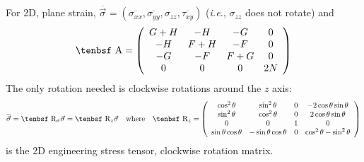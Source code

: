 \documentclass[11pt]{article}
\def\A{\hbox{\tenbsf A}}
\def\R{\hbox{\tenbsf R}}
\def\s#1{\sigma_{#1}}
\def\t#1{\tau_{#1}}
\begin{document}
For 2D, plane strain, $\overline{\vec\s{}} = (\overline{\s{xx}}, \overline{\s{yy}}, \s{zz}, \overline{\t{xy}})$ ({\em i.e.}, $\s{zz}$ does not rotate) and
\begin{equation}
      \A = \left( \begin{array}{cccc}
                       G+H & -H & -G & 0 \\
                       -H & F+H & -F & 0 \\
                       -G & -F & F+G & 0 \\
                       0 & 0 & 0 & 2N
                       \end{array} \right)
\end{equation}
The only rotation needed is clockwise rotations around the $z$ axis:
\begin{equation}
      \overline{\vec\s{}} = \R_\sigma\vec\s{} = \R_z\vec\s{}  \quad{\rm where}\quad \R_z = \left( \begin{array}{cccc}
                       \cos^2\theta & \sin^2\theta & 0 & -2\cos\theta\sin\theta \\
                       \sin^2\theta & \cos^2\theta & 0 & 2\cos\theta\sin\theta \\
                       0 & 0 & 1 & 0 \\
                       \sin\theta\cos\theta & -\sin\theta\cos\theta & 0 & \cos^2\theta - \sin^2\theta
                       \end{array} \right)
\end{equation}
is the 2D engineering stress tensor, clockwise rotation matrix.
\end{document}
